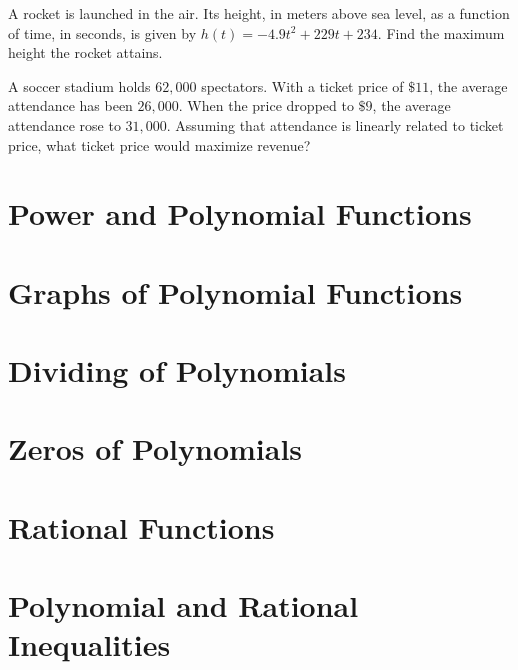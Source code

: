 \begin{exercise}
  A rocket is launched in the air. Its height, in meters above sea level, as a function of time, in seconds, is given by \(h(t)=-4.9t^2+229t+234\). Find the maximum height the rocket attains.
\end{exercise}

\begin{exercise}
  A soccer stadium holds \(62,000\) spectators. With a ticket price of \(\$11\), the average attendance has been \(26,000\). When the price dropped to \(\$9\), the average attendance rose to \(31,000\). Assuming that attendance is linearly related to ticket price, what ticket price would maximize revenue?
\end{exercise}

\newpage

\section{Power and Polynomial Functions}

\section{Graphs of Polynomial Functions}

\section{Dividing of Polynomials}

\section{Zeros of Polynomials}

\section{Rational Functions}

\section{Polynomial and Rational Inequalities}



